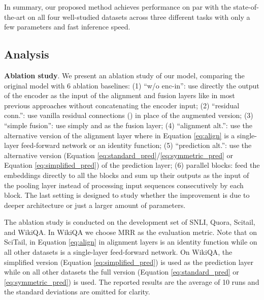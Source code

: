\documentclass[11pt,a4paper]{article}
\begin{document}
In summary, our proposed method achieves performance on par with the state-of-the-art on all four well-studied datasets across three different tasks with only a few parameters and fast inference speed. 

\subsection{Analysis}

{\bf Ablation study}. 
We present an ablation study of our model, comparing the original model with 6 ablation baselines: (1) ``w/o enc-in'': use directly the output of the encoder as the input of the alignment and fusion layers like in most previous approaches without concatenating the encoder input; (2) ``residual conn.'': use vanilla residual connections () in place of the augmented version; (3) ``simple fusion'': use simply  and  as the fusion layer; (4) ``alignment alt.'': use the alternative version of the alignment layer where  in Equation \ref{eq:align} is a single-layer feed-forward network or an identity function; (5) ``prediction alt.'': use the alternative version (Equation \ref{eq:standard_pred}/\ref{eq:symmetric_pred} or Equation \ref{eq:simplified_pred}) of the prediction layer; (6) parallel blocks: feed the embeddings directly to all the blocks and sum up their outputs as the input of the pooling layer instead of processing input sequences consecutively by each block. The last setting is designed to study whether the improvement is due to deeper architecture or just a larger amount of parameters. 

The ablation study is conducted on the development set of SNLI, Quora, Scitail, and WikiQA. In WikiQA we choose MRR as the evaluation metric. Note that on SciTail,  in Equation \ref{eq:align} in alignment layers is an identity function while on all other datasets  is a single-layer feed-forward network. On WikiQA, the simplified version (Equation \ref{eq:simplified_pred}) is used as the prediction layer while on all other datasets the full version (Equation \ref{eq:standard_pred} or \ref{eq:symmetric_pred}) is used. The reported results are the average of 10 runs and the standard deviations are omitted for clarity.
\end{document}
